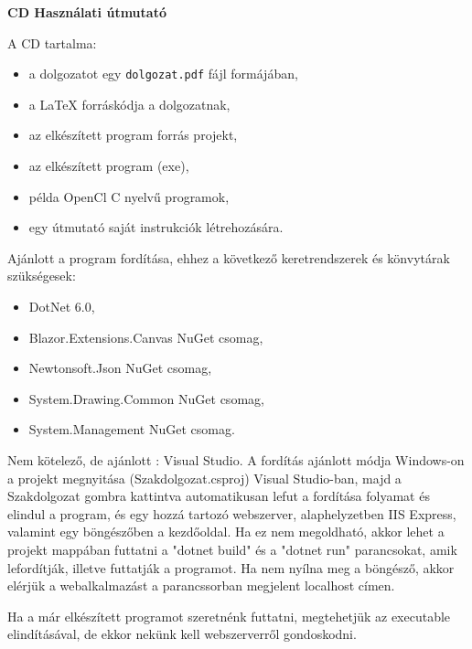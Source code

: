 \pagestyle{empty}

\noindent \textbf{\Large CD Használati útmutató}

\vskip 1cm

A CD tartalma:
\begin{itemize}
\item a dolgozatot egy \texttt{dolgozat.pdf} fájl formájában,
\item a LaTeX forráskódja a dolgozatnak,
\item az elkészített program forrás projekt,
\item az elkészített program (exe),
\item példa OpenCl C nyelvű programok,
\item egy útmutató saját instrukciók létrehozására.
\end{itemize}

Ajánlott a program fordítása, ehhez a következő keretrendszerek és könvytárak szükségesek: 
\begin{itemize}
\item DotNet 6.0,
\item Blazor.Extensions.Canvas NuGet csomag,
\item Newtonsoft.Json NuGet csomag,
\item System.Drawing.Common NuGet csomag,
\item System.Management  NuGet csomag.
\end{itemize}

Nem kötelező, de ajánlott : Visual Studio.
A fordítás ajánlott módja Windows-on a projekt megnyitása (Szakdolgozat.csproj) Visual Studio-ban, majd a Szakdolgozat gombra kattintva automatikusan lefut a fordítása folyamat és elindul a program, és egy hozzá tartozó webszerver, alaphelyzetben IIS Express, valamint egy böngészőben a kezdőoldal.
Ha ez nem megoldható, akkor lehet a projekt mappában futtatni a "dotnet build" és a "dotnet run" parancsokat, amik lefordítják, illetve futtatják a programot. Ha nem nyílna meg a böngésző, akkor elérjük a webalkalmazást a parancssorban megjelent localhost címen.

Ha a már elkészített programot szeretnénk futtatni, megtehetjük az executable elindításával, de ekkor nekünk kell webszerverről gondoskodni.

